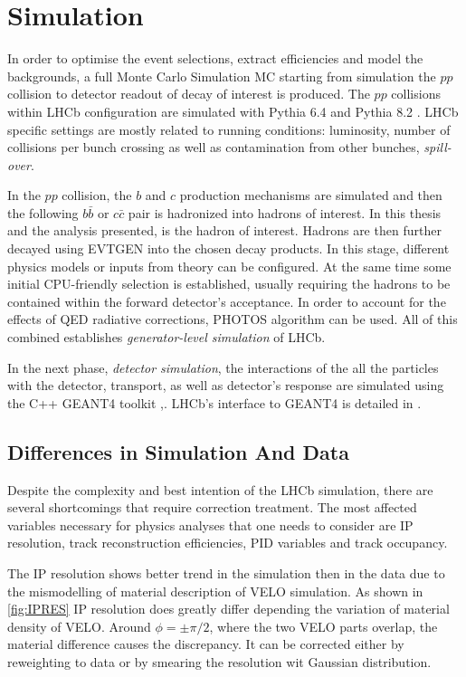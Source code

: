 \section{Simulation}
In order to optimise the event selections, extract efficiencies and model the backgrounds, a full Monte Carlo Simulation \Gls{MC} starting from simulation the $pp$ collision to detector readout of decay of interest is produced. 
The $pp$ collisions within \Gls{LHCb} configuration \cite{Belyaev:2011zza} are simulated with Pythia 6.4 \cite{pythia6} and Pythia 8.2 \cite{pythia8}. \Gls{LHCb} specific settings are mostly related to running conditions: luminosity, number of collisions per bunch crossing as well as contamination from other bunches, \textit{spill-over}. 

In the $pp$ collision, the $b$ and $c$ production mechanisms are simulated and then the following $b\bar{b}$ or $c\bar{c}$ pair is hadronized into hadrons of interest. In this thesis and the analysis presented, \Bp is the hadron of interest. Hadrons are then further decayed using EVTGEN \cite{Lange:2001uf} into the chosen decay products. In this stage, different physics models or inputs from theory can be configured. At the same time some initial CPU-friendly selection is established, usually requiring the hadrons to be contained within the forward detector's acceptance.
In order to account for the effects of \Gls{QED} radiative corrections, PHOTOS \cite{photos} algorithm can be used. All of this combined establishes \textit{generator-level simulation} of LHCb.


In the next phase, \textit{detector simulation}, the interactions of the all the particles with the detector, transport, as well as detector's response are simulated using the C++ GEANT4 toolkit \cite{Geant4},\cite{Agostinelli:2002hh}. \Gls{LHCb}'s interface to GEANT4 is detailed in \cite{Clemencic:2011zza}. 

\subsection{Differences in Simulation And Data}
Despite the complexity and best intention of the \Gls{LHCb} simulation, there are several shortcomings that require correction treatment.
The most affected variables necessary for physics analyses that one needs to consider are \Gls{IP} resolution, track reconstruction efficiencies, \Gls{PID} variables and track occupancy.

The \Gls{IP} resolution shows better trend in the simulation then in the data due to the mismodelling of material description of \Gls{VELO} simulation. As shown in \autoref{fig:IPRES} \Gls{IP} resolution does greatly differ depending the variation of material density of \Gls{VELO}. Around $\phi=\pm\pi/2$, where the two \Gls{VELO} parts overlap, the material difference causes the discrepancy. It can be corrected either by reweighting to data or by smearing the resolution wit Gaussian distribution.

